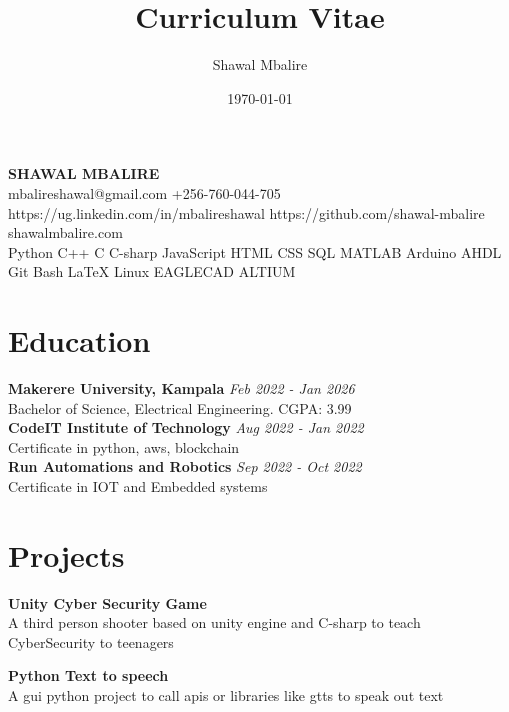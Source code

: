 \documentclass[a4paper]{article}
\title{Curriculum Vitae}
\author{Shawal Mbalire}
\date{\today}
\begin{document}
    \begin{center}
        \LARGE{\bf SHAWAL MBALIRE} \\
        {\small
        mbalireshawal@gmail.com
        +256-760-044-705
        https://ug.linkedin.com/in/mbalireshawal
        https://github.com/shawal-mbalire
        shawalmbalire.com\\
        Python C++ C  C-sharp JavaScript
        HTML CSS SQL MATLAB
        Arduino AHDL Git Bash LaTeX Linux
        EAGLECAD ALTIUM}
    \end{center}

    \begin{minipage}[t]{0.5\textwidth}

        \section*{\bf Education}
        {\bf Makerere University, Kampala}
        \hfil{\em Feb 2022 - Jan 2026}\\
        Bachelor of Science, Electrical Engineering.
        \hfil CGPA: 3.99\\
        {\bf CodeIT Institute of Technology}
        \hfil{\em Aug 2022 - Jan 2022}\\
        Certificate in python, aws, blockchain\\
        {\bf Run Automations and Robotics}
        \hfil{\em Sep 2022 - Oct 2022}\\
        Certificate in IOT and Embedded systems


        \section*{\bf Projects}

        {\bf Unity Cyber Security Game}\\
        A third person shooter based on unity engine and C-sharp to teach CyberSecurity to teenagers

        {\bf Python Text to speech}\\
        A gui python project to call apis or libraries like gtts to speak out text


\end{minipage}
\end{document}
